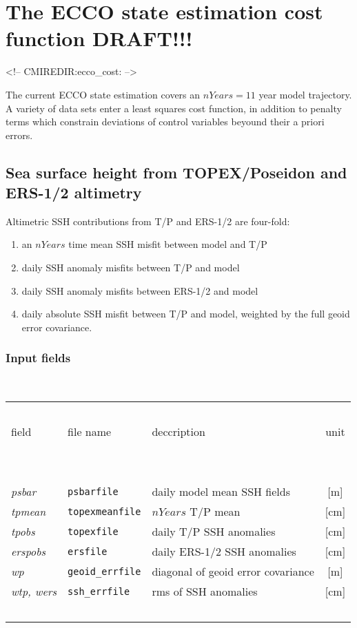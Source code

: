 \section{The ECCO state estimation cost function DRAFT!!!
\label{sectioneccocost}}
\begin{rawhtml}
<!-- CMIREDIR:ecco_cost: -->
\end{rawhtml}

The current ECCO state estimation covers an $nYears = 11$ year
model trajectory.
A variety of data sets enter a least squares cost function,
in addition to penalty terms which constrain deviations
of control variables beyound their a priori errors.

\subsection{Sea surface height from TOPEX/Poseidon and ERS-1/2 altimetry}

Altimetric SSH contributions from T/P and ERS-1/2 are four-fold:
%
\begin{enumerate}
%
\item 
an $nYears$ time mean SSH misfit between
model and T/P
%
\item
daily SSH anomaly misfits between T/P and model
%
\item
daily SSH anomaly misfits between ERS-1/2 and model
%
\item
daily absolute SSH misfit between T/P and model,
weighted by the full geoid error covariance.
%
\end{enumerate}

\subsubsection{Input fields}
~

\begin{table}[h!]
\begin{center}
\begin{tabular}{lllc}
\hline \hline
~&~&~&~\\
field & file name & deccription & unit \\
~&~&~&~\\
\hline
~&~&~&~\\
{\it psbar} & {\tt psbarfile} & daily model mean SSH fields & [m] \\
{\it tpmean} & {\tt topexmeanfile} & $nYears$ T/P mean & [cm] \\
{\it tpobs}  & {\tt topexfile} & daily T/P SSH anomalies & [cm] \\
{\it erspobs}  & {\tt ersfile} & daily ERS-1/2 SSH anomalies & [cm] \\
{\it wp} & {\tt geoid\_errfile} & diagonal of geoid error covariance & [m] \\
{\it wtp, wers} & {\tt ssh\_errfile} & rms of SSH anomalies & [cm] \\
~&~&~&~\\
\hline \hline
\end{tabular}
\end{center}
\end{table}


